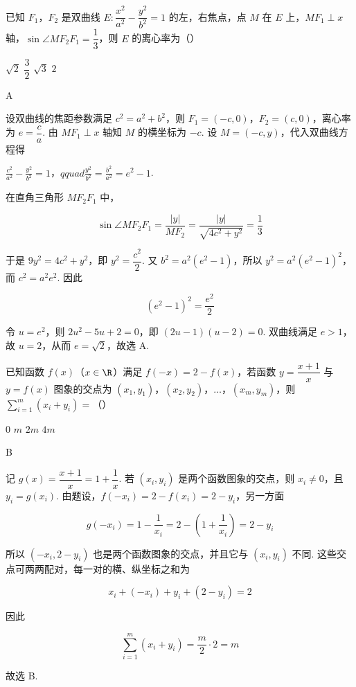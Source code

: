 \begin{problem}
已知 \(F_1\)，\(F_2\) 是双曲线 \(E:\dfrac{x^2}{a^2}-\dfrac{y^2}{b^2}=1\) 的左，右焦点，点 \(M\) 在 \(E\) 上，\(MF_1\perp x\) 轴，\(\sin\angle MF_2F_1=\dfrac13\)，则 \(E\) 的离心率为（\quad）

\choices
    {\(\sqrt2\)}
    {\(\dfrac32\)}
    {\(\sqrt3\)}
    {\(2\)}
\end{problem}

\begin{answer}
A
\end{answer}

\begin{solution}
设双曲线的焦距参数满足 \(c^2=a^2+b^2\)，则 \(F_1=(-c,0)\)，\(F_2=(c,0)\)，离心率为 \(e=\dfrac ca\). 由 \(MF_1\perp x\) 轴知 \(M\) 的横坐标为 \(-c\). 设 \(M=(-c,y)\)，代入双曲线方程得

\(\frac{c^2}{a^2}-\frac{y^2}{b^2}=1\)，\(qquad \frac{y^2}{b^2}=\frac{b^2}{a^2}=e^2-1\).

在直角三角形 \(MF_2F_1\) 中，

\[
\sin\angle MF_2F_1=\frac{|y|}{MF_2}=\frac{|y|}{\sqrt{4c^2+y^2}}=\frac13
\]

于是 \(9y^2=4c^2+y^2\)，即 \(y^2=\dfrac{c^2}{2}\). 又 \(b^2=a^2(e^2-1)\)，所以 \(y^2=a^2(e^2-1)^2\)，而 \(c^2=a^2e^2\). 因此

\[
(e^2-1)^2=\frac{e^2}{2}
\]

令 \(u=e^2\)，则 \(2u^2-5u+2=0\)，即 \((2u-1)(u-2)=0\). 双曲线满足 \(e>1\)，故 \(u=2\)，从而 \(e=\sqrt2\)，故选 A.
\end{solution}

\begin{problem}
已知函数 \(f(x)\)（\(x\in\R\)）满足 \(f(-x)=2-f(x)\)，若函数 \(y=\dfrac{x+1}{x}\) 与 \(y=f(x)\) 图象的交点为 \((x_1,y_1)\)，\((x_2,y_2)\)，\(\dots\)，\((x_m,y_m)\)，则 \(\displaystyle\sum_{i=1}^m(x_i+y_i)=\)（\quad）

\choices
    {\(0\)}
    {\(m\)}
    {\(2m\)}
    {\(4m\)}
\end{problem}

\begin{answer}
B
\end{answer}

\begin{solution}
记 \(g(x)=\dfrac{x+1}{x}=1+\dfrac1x\). 若 \((x_i,y_i)\) 是两个函数图象的交点，则 \(x_i\ne0\)，且 \(y_i=g(x_i)\). 由题设，\(f(-x_i)=2-f(x_i)=2-y_i\)，另一方面

\[
g(-x_i)=1-\dfrac1{x_i}=2-\left(1+\dfrac1{x_i}\right)=2-y_i
\]

所以 \((-x_i,2-y_i)\) 也是两个函数图象的交点，并且它与 \((x_i,y_i)\) 不同. 这些交点可两两配对，每一对的横、纵坐标之和为

\[
x_i+(-x_i)+y_i+(2-y_i)=2
\]

因此

\[
\sum_{i=1}^m(x_i+y_i)=\frac m2\cdot2=m
\]

故选 B.
\end{solution}

